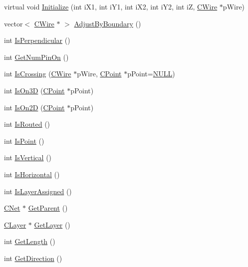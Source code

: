 \begin{DoxyCompactItemize}
\item 
virtual void \mbox{\hyperlink{classCWire_abda250d5147d4fcf3721d4d89d238606}{Initialize}} (int i\+X1, int i\+Y1, int i\+X2, int i\+Y2, int iZ, \mbox{\hyperlink{classCWire}{C\+Wire}} $\ast$p\+Wire)
\item 
vector$<$ \mbox{\hyperlink{classCWire}{C\+Wire}} $\ast$ $>$ \mbox{\hyperlink{classCWire_a164104850603ca31076daf202401b77b}{Adjust\+By\+Boundary}} ()
\item 
int \mbox{\hyperlink{classCWire_aa724c8a82464a69ae346ca284f166754}{Is\+Perpendicular}} ()
\item 
int \mbox{\hyperlink{classCWire_a095a9358f9fe790d5010fef23a8a209e}{Get\+Num\+Pin\+On}} ()
\item 
int \mbox{\hyperlink{classCWire_a961f580e533277ae6c618f52f4c105e0}{Is\+Crossing}} (\mbox{\hyperlink{classCWire}{C\+Wire}} $\ast$p\+Wire, \mbox{\hyperlink{classCPoint}{C\+Point}} $\ast$p\+Point=\mbox{\hyperlink{BoxRouter_8h_a070d2ce7b6bb7e5c05602aa8c308d0c4}{N\+U\+LL}})
\item 
int \mbox{\hyperlink{classCWire_a4f6c29e13aad894c7bb57e59ae555421}{Is\+On3D}} (\mbox{\hyperlink{classCPoint}{C\+Point}} $\ast$p\+Point)
\item 
int \mbox{\hyperlink{classCWire_aa0addc021fd850f888ec7c703ffe91d7}{Is\+On2D}} (\mbox{\hyperlink{classCPoint}{C\+Point}} $\ast$p\+Point)
\item 
int \mbox{\hyperlink{classCWire_a8edc31661e3d037da712ad64cd7b8b5b}{Is\+Routed}} ()
\item 
int \mbox{\hyperlink{classCWire_a47047894df3b85fb3f5af6755002b4f6}{Is\+Point}} ()
\item 
int \mbox{\hyperlink{classCWire_a5459f08bfd3912aae672915a05bcfb38}{Is\+Vertical}} ()
\item 
int \mbox{\hyperlink{classCWire_a24f10d80a124f5929fcca8fb026c718d}{Is\+Horizontal}} ()
\item 
int \mbox{\hyperlink{classCWire_a58444c1e0db9838445654d85a3405741}{Is\+Layer\+Assigned}} ()
\item 
\mbox{\hyperlink{classCNet}{C\+Net}} $\ast$ \mbox{\hyperlink{classCWire_a98ece8df0778eb16cf0690c4aa5352f0}{Get\+Parent}} ()
\item 
\mbox{\hyperlink{classCLayer}{C\+Layer}} $\ast$ \mbox{\hyperlink{classCWire_a828800be53e43a40999877e9a56f8c20}{Get\+Layer}} ()
\item 
int \mbox{\hyperlink{classCWire_a063474510062c4cd858fb5bfc04daffb}{Get\+Length}} ()
\item 
int \mbox{\hyperlink{classCWire_a737e918e2752d29ef32db9bc4648cb90}{Get\+Direction}} ()

\end{DoxyCompactItemize}
